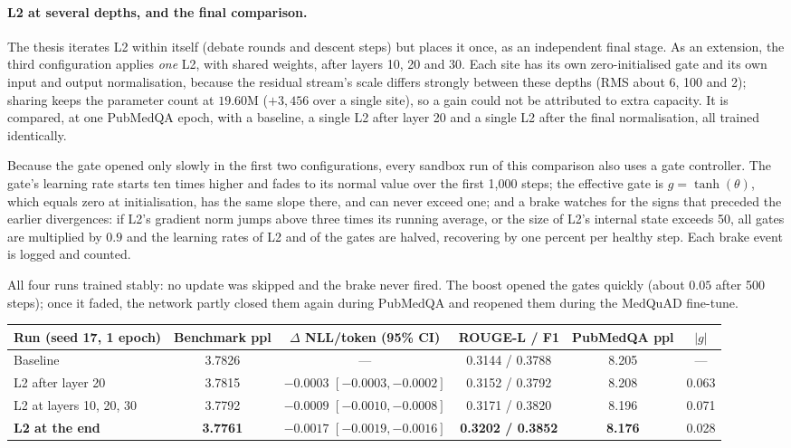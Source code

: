 \documentclass[11pt,a4paper]{article}
\theoremstyle{plain}
\theoremstyle{definition}
\theoremstyle{remark}
\begin{document}
\paragraph{L2 at several depths, and the final comparison.}
The thesis iterates L2 within itself (debate rounds and descent steps) but
places it once, as an independent final stage. As an extension, the third configuration applies \emph{one} L2, with
shared weights, after layers 10, 20 and 30. Each site has its own
zero-initialised gate and its own input and output normalisation, because the
residual stream's scale differs strongly between these depths (RMS about 6,
100 and 2); sharing keeps the parameter count at $19.60$M ($+3{,}456$ over a
single site), so a gain could not be attributed to extra capacity. It is
compared, at one PubMedQA epoch, with a baseline, a single L2 after layer 20
and a single L2 after the final normalisation, all trained identically.

\noindent
Because the gate opened only slowly in the first two configurations, every
sandbox run of this comparison also uses a gate controller. The gate's
learning rate starts ten times higher and fades to its normal value over the
first 1{,}000 steps; the effective gate is $g = \tanh(\theta)$, which equals
zero at initialisation, has the same slope there, and can never exceed one;
and a brake watches for the signs that preceded the earlier divergences: if
L2's gradient norm jumps above three times its running average, or the size
of L2's internal state exceeds 50, all gates are multiplied by $0.9$ and the
learning rates of L2 and of the gates are halved, recovering by one percent
per healthy step. Each brake event is logged and counted.

\noindent
All four runs trained stably: no update was skipped and the brake never fired.
The boost opened the gates quickly (about $0.05$ after 500 steps); once it
faded, the network partly closed them again during PubMedQA and reopened them
during the MedQuAD fine-tune.

\begin{center}
\small
\begin{tabular}{@{}lccccc@{}}
\toprule
\rowcolor{ekHeadBG}\color{white}\textbf{Run (seed 17, 1 epoch)} & \color{white}\textbf{Benchmark ppl} & \color{white}\textbf{$\Delta$ NLL/token (95\% CI)} & \color{white}\textbf{ROUGE-L / F1} & \color{white}\textbf{PubMedQA ppl} & \color{white}\textbf{$|g|$} \\
\midrule
Baseline & 3.7826 & --- & 0.3144 / 0.3788 & 8.205 & --- \\
L2 after layer 20 & 3.7815 & $-0.0003$ $[-0.0003, -0.0002]$ & 0.3152 / 0.3792 & 8.208 & 0.063 \\
L2 at layers 10, 20, 30 & 3.7792 & $-0.0009$ $[-0.0010, -0.0008]$ & 0.3171 / 0.3820 & 8.196 & 0.071 \\
\textbf{L2 at the end} & \textbf{3.7761} & $\mathbf{-0.0017}$ $[-0.0019, -0.0016]$ & \textbf{0.3202 / 0.3852} & \textbf{8.176} & 0.028 \\
\bottomrule
\end{tabular}
\end{center}
\end{document}
